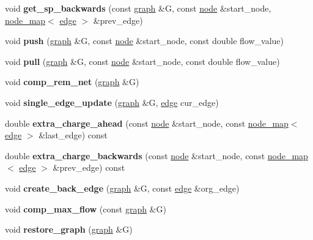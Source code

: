 \begin{DoxyCompactItemize}
void {\bfseries get\+\_\+sp\+\_\+backwards} (const \mbox{\hyperlink{classgraph}{graph}} \&G, const \mbox{\hyperlink{classnode}{node}} \&start\+\_\+node, \mbox{\hyperlink{classnode__map}{node\+\_\+map}}$<$ \mbox{\hyperlink{classedge}{edge}} $>$ \&prev\+\_\+edge)
\item 
\mbox{\label{classmaxflow__pp_ae7c9ce8d1cad511d70022e2f62567590}} 
void {\bfseries push} (\mbox{\hyperlink{classgraph}{graph}} \&G, const \mbox{\hyperlink{classnode}{node}} \&start\+\_\+node, const double flow\+\_\+value)
\item 
\mbox{\label{classmaxflow__pp_aba2aefadd6dde920b8b8aa44af95ad9b}} 
void {\bfseries pull} (\mbox{\hyperlink{classgraph}{graph}} \&G, const \mbox{\hyperlink{classnode}{node}} \&start\+\_\+node, const double flow\+\_\+value)
\item 
\mbox{\label{classmaxflow__pp_a97612b9517f0f11715610cb8faa81606}} 
void {\bfseries comp\+\_\+rem\+\_\+net} (\mbox{\hyperlink{classgraph}{graph}} \&G)
\item 
\mbox{\label{classmaxflow__pp_a3e59652a416d1553f8a1d1229dd2cd38}} 
void {\bfseries single\+\_\+edge\+\_\+update} (\mbox{\hyperlink{classgraph}{graph}} \&G, \mbox{\hyperlink{classedge}{edge}} cur\+\_\+edge)
\item 
\mbox{\label{classmaxflow__pp_af60a96de8ef929ceefd32d387e8e1638}} 
double {\bfseries extra\+\_\+charge\+\_\+ahead} (const \mbox{\hyperlink{classnode}{node}} \&start\+\_\+node, const \mbox{\hyperlink{classnode__map}{node\+\_\+map}}$<$ \mbox{\hyperlink{classedge}{edge}} $>$ \&last\+\_\+edge) const
\item 
\mbox{\label{classmaxflow__pp_a9d9651e53139201506b22eed1ecbdd51}} 
double {\bfseries extra\+\_\+charge\+\_\+backwards} (const \mbox{\hyperlink{classnode}{node}} \&start\+\_\+node, const \mbox{\hyperlink{classnode__map}{node\+\_\+map}}$<$ \mbox{\hyperlink{classedge}{edge}} $>$ \&prev\+\_\+edge) const
\item 
\mbox{\label{classmaxflow__pp_a20abf72dadaac19acb027ff5fa62de2a}} 
void {\bfseries create\+\_\+back\+\_\+edge} (\mbox{\hyperlink{classgraph}{graph}} \&G, const \mbox{\hyperlink{classedge}{edge}} \&org\+\_\+edge)
\item 
\mbox{\label{classmaxflow__pp_a6a8a301739757493318b1abfbed2698b}} 
void {\bfseries comp\+\_\+max\+\_\+flow} (const \mbox{\hyperlink{classgraph}{graph}} \&G)
\item 
\mbox{\label{classmaxflow__pp_a273cc9bde3aeb47c08223da7458ed29d}} 
void {\bfseries restore\+\_\+graph} (\mbox{\hyperlink{classgraph}{graph}} \&G)
\end{DoxyCompactItemize}
